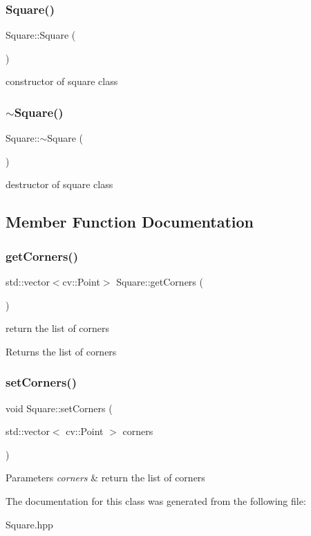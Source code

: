 \subsubsection{\texorpdfstring{Square()}{Square()}}
{\footnotesize\ttfamily Square\+::\+Square (\begin{DoxyParamCaption}{ }\end{DoxyParamCaption})}

constructor of square class \mbox{\label{class_square_a90af7ce1060cff7b717ceddb333846b8}} 
\subsubsection{\texorpdfstring{$\sim$\+Square()}{~Square()}}
{\footnotesize\ttfamily Square\+::$\sim$\+Square (\begin{DoxyParamCaption}{ }\end{DoxyParamCaption})}

destructor of square class 

\subsection{Member Function Documentation}
\mbox{\label{class_square_a53b1e1223e97676db711dd75f2daa508}} 
\subsubsection{\texorpdfstring{get\+Corners()}{getCorners()}}
{\footnotesize\ttfamily std\+::vector$<$cv\+::\+Point$>$ Square\+::get\+Corners (\begin{DoxyParamCaption}{ }\end{DoxyParamCaption})}

return the list of corners \begin{DoxyReturn}{Returns}
the list of corners 
\end{DoxyReturn}
\mbox{\label{class_square_a84c4995b49318b5191a4fe3739e4f081}} 
\subsubsection{\texorpdfstring{set\+Corners()}{setCorners()}}
{\footnotesize\ttfamily void Square\+::set\+Corners (\begin{DoxyParamCaption}\item[{std\+::vector$<$ cv\+::\+Point $>$}]{corners }\end{DoxyParamCaption})}


\begin{DoxyParams}{Parameters}
{\em corners} & return the list of corners \\
\hline
\end{DoxyParams}


The documentation for this class was generated from the following file\+:\begin{DoxyCompactItemize}
\item 
Square.\+hpp\end{DoxyCompactItemize}
